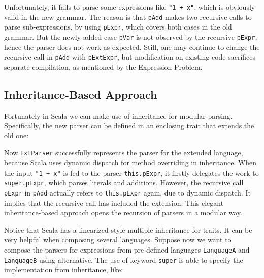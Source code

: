 
Unfortunately, it fails to parse some expressions like \lstinline{"1 + x"}, which is obviously valid in the new grammar.
The reason is that \lstinline{pAdd} makes two recursive calls to parse sub-expressions, by using \lstinline{pExpr}, which
covers both cases in the old grammar. But the newly added case \lstinline{pVar} is not observed by the recursive \lstinline{pExpr},
hence the parser does not work as expected. Still, one may continue to change the recursive call in \lstinline{pAdd} with \lstinline{pExtExpr},
but modification on existing code sacrifices separate compilation, as mentioned by the Expression Problem.

\subsection{Inheritance-Based Approach}\label{subsec:inheritance-approach}

Fortunately in Scala we can make use of inheritance for modular parsing. Specifically,
the new parser can be defined in an enclosing trait that extends
the old one:

Now \lstinline{ExtParser} successfully represents the parser for the extended language, because Scala uses dynamic dispatch for
method overriding in inheritance. When the input \lstinline{"1 + x"} is fed to the parser \lstinline{this.pExpr}, it firstly delegates
the work to \lstinline{super.pExpr}, which parses literals and additions. However, the recursive call \lstinline{pExpr} in \lstinline{pAdd}
actually refers to \lstinline{this.pExpr} again, due to dynamic dispatch. It implies that the recursive call has included the extension. This
elegant inheritance-based approach opens the recursion of parsers in a modular way.

Notice that Scala has a linearized-style multiple inheritance for traits. It can be very helpful when composing several languages. Suppose now
we want to compose the parsers for expressions from pre-defined languages \lstinline{LanguageA} and \lstinline{LanguageB} using alternative.
The use of keyword \lstinline{super} is able to
specify the implementation from inheritance, like:


